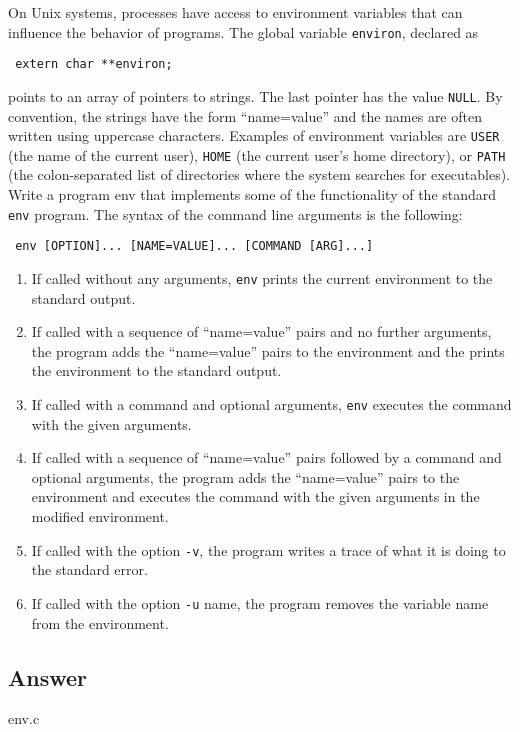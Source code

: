 \documentclass[
	12pt, %
]{fphw}
\begin{document}
\begin{problem}
	On Unix systems, processes have access to environment variables that can influence the behavior
	of programs. The global variable \texttt{environ}, declared as\newline

	\texttt{	extern char **environ;}	\newline

	points to an array of pointers to strings. The last pointer has the value \texttt{NULL}. By convention, the
	strings have the form “name=value” and the names are often written using uppercase characters.
	Examples of environment variables are \texttt{USER} (the name of the current user), \texttt{HOME} (the current
	user’s home directory), or \texttt{PATH} (the colon-separated list of directories where the system searches
	for executables).\newline
	Write a program env that implements some of the functionality of the standard \texttt{env} program. The
	syntax of the command line arguments is the following:\newline

	\texttt{	env [OPTION]... [NAME=VALUE]... [COMMAND [ARG]...]}\newline
	\medskip
	
	\begin{enumerate} %
		\item If called without any arguments, \texttt{env} prints the current environment to the standard output.
		\item If called with a sequence of “name=value” pairs and no further arguments, the program adds
		the “name=value” pairs to the environment and the prints the environment to the standard
		output.
		\item If called with a command and optional arguments, \texttt{env} executes the command with the given
		arguments.
		\item If called with a sequence of “name=value” pairs followed by a command and optional arguments, the program adds the “name=value” pairs to the environment and executes the command with the given arguments in the modified environment.
		\item If called with the option \texttt{-v}, the program writes a trace of what it is doing to the standard error.
		\item If called with the option \texttt{-u} name, the program removes the variable name from the environment.
	\end{enumerate}\end{problem}


\subsection*{Answer} 

env.c


\end{document}
